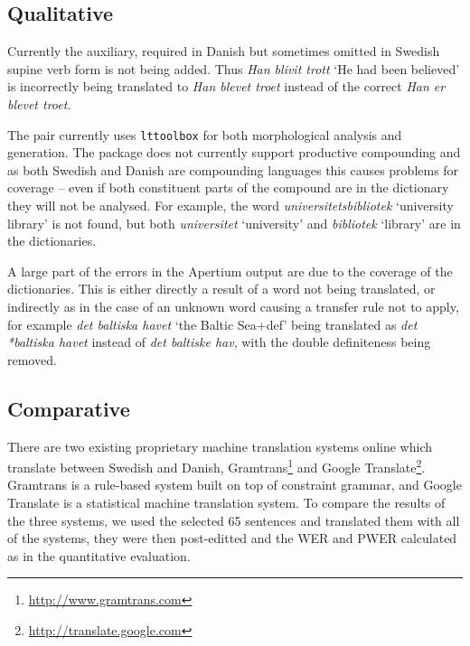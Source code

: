 \documentclass[11pt]{article}
\begin{document}
\subsection{Qualitative}


Currently the auxiliary, required in Danish but sometimes omitted in Swedish supine 
verb form is not being added. Thus \emph{Han blivit trott} `He had been believed' 
is incorrectly being translated to \emph{Han blevet troet} instead of the 
correct \emph{Han er blevet troet}.

The pair currently uses {\tt\small lttoolbox} \citep{ortiz2005} for both morphological 
analysis and generation. The package does not currently support productive compounding and as
both Swedish and Danish are compounding languages this causes problems for 
coverage -- even if both constituent parts of the compound are in the dictionary they
will not be analysed. For example, the word \emph{universitetsbibliotek} `university library' is 
not found, but both \emph{universitet} `university' and \emph{bibliotek} `library'
are in the dictionaries.

A large part of the errors in the Apertium output are due to the coverage of the 
dictionaries. This is either directly a result of a word not being translated, or indirectly
as in the case of an unknown word causing a transfer rule not to apply, for example
\emph{det baltiska havet} `the Baltic Sea+{\sc def}' being translated as \emph{det *baltiska havet}
instead of \emph{det baltiske hav}, with the double definiteness being removed.

\subsection{Comparative} %

There are two existing proprietary machine translation systems online which translate 
between Swedish and Danish, Gramtrans\footnote{\url{http://www.gramtrans.com}} and Google
Translate\footnote{\url{http://translate.google.com}}. Gramtrans is a rule-based system
built on top of constraint grammar, and Google Translate is a statistical machine translation
system. To compare the results of the three systems, we used the selected 65 sentences and translated
them with all of the systems, they were then post-editted and the WER and PWER calculated
as in the quantitative evaluation.
\end{document}
